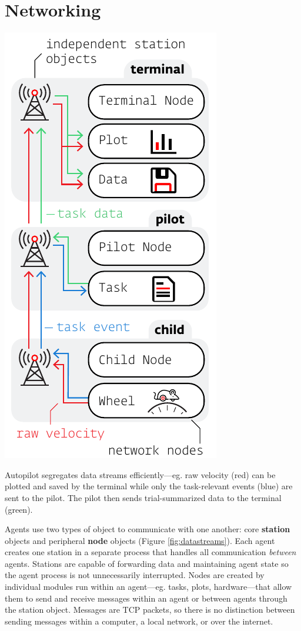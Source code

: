 
\section{Networking}
\label{sec:networking}

\begin{marginfigure}[0.8cm]
\includegraphics[]{figures/side_24_networking.pdf}
\caption{Autopilot segregates data streams efficiently---eg. raw velocity (red) can be plotted and saved by the terminal while only the task-relevant events (blue) are sent to the pilot. The pilot then sends trial-summarized data to the terminal (green).}
\label{fig:datastreams}
\end{marginfigure}

Agents use two types of object to communicate with one another: core \textbf{station} objects and peripheral \textbf{node} objects (Figure \ref{fig:datastreams}). Each agent creates one station in a separate process that handles all communication \textit{between} agents. Stations are capable of forwarding data and maintaining agent state so the agent process is not unnecessarily interrupted. Nodes are created by individual modules run within an agent---eg. tasks, plots, hardware---that allow them to send and receive messages within an agent or between agents through the station object. Messages are TCP packets, so there is no distinction between sending messages within a computer, a local network, or over the internet.

